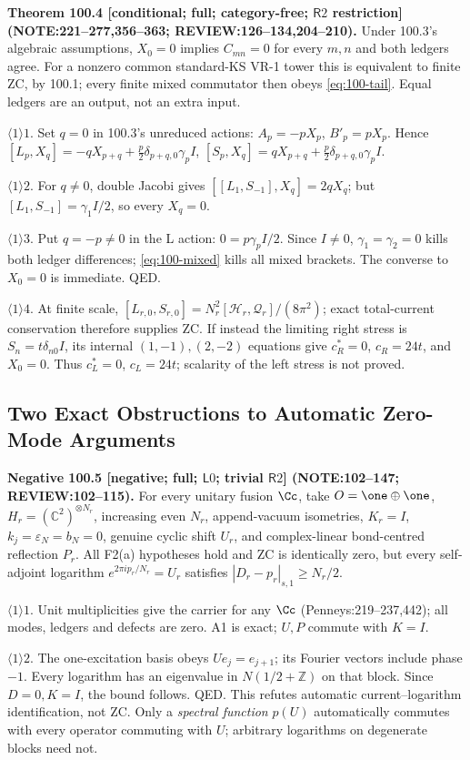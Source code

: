 \textbf{Theorem 100.4 [conditional; full; category-free; \(\mathsf R2\) restriction] (NOTE:221--277,356--363; REVIEW:126--134,204--210).}
Under 100.3's algebraic assumptions, \(X_0=0\) implies \(C_{mn}=0\) for every \(m,n\) and both ledgers agree.
For a nonzero common standard-KS VR-1 tower this is equivalent to finite ZC, by 100.1; every finite mixed
commutator then obeys \eqref{eq:100-tail}. Equal ledgers are an output, not an extra input.
\par\(\langle1\rangle1\). Set \(q=0\) in 100.3's unreduced actions: \(A_p=-pX_p\), \(B'_p=pX_p\). Hence
\([L_p,X_q]=-qX_{p+q}+\tfrac p2\delta_{p+q,0}\gamma_pI\),
\([S_p,X_q]=qX_{p+q}+\tfrac p2\delta_{p+q,0}\gamma_pI\).
\par\(\langle1\rangle2\). For \(q\ne0\), double Jacobi gives
\([[L_1,S_{-1}],X_q]=2qX_q\); but \([L_1,S_{-1}]=\gamma_1I/2\), so every \(X_q=0\).
\par\(\langle1\rangle3\). Put \(q=-p\ne0\) in the L action: \(0=p\gamma_pI/2\).
Since \(I\ne0\), \(\gamma_1=\gamma_2=0\) kills both ledger differences; \eqref{eq:100-mixed} kills all mixed brackets.
The converse to \(X_0=0\) is immediate. QED.
\par\(\langle1\rangle4\). At finite scale,
\([L_{r,0},S_{r,0}]=N_r^2[\mathcal H_r,\mathcal Q_r]/(8\pi^2)\); exact total-current conservation therefore supplies ZC.
If instead the limiting right stress is \(S_n=t\delta_{n0}I\), its internal \((1,-1),(2,-2)\) equations give
\(c_R^*=0\), \(c_R=24t\), and \(X_0=0\). Thus \(c_L^*=0\), \(c_L=24t\); scalarity of the left stress is not proved.

\subsection{Two Exact Obstructions to Automatic Zero-Mode Arguments}

\textbf{Negative 100.5 [negative; full; \(\mathsf L0\); trivial \(\mathsf R2\)] (NOTE:102--147; REVIEW:102--115).}
For every unitary fusion \(\Cc\), take \(O=\one\oplus\one\), \(H_r=(\mathbb C^2)^{\otimes N_r}\), increasing even
\(N_r\), append-vacuum isometries, \(K_r=I\), \(k_j=\varepsilon_N=b_N=0\), genuine cyclic shift \(U_r\),
and complex-linear bond-centred reflection \(P_r\). All F2(a) hypotheses hold and ZC is identically zero,
but every self-adjoint logarithm \(e^{2\pi ip_r/N_r}=U_r\) satisfies \(|D_r-p_r|_{s,1}\ge N_r/2\).
\par\(\langle1\rangle1\). Unit multiplicities give the carrier for any \(\Cc\) (Penneys:219--237,442);
all modes, ledgers and defects are zero. A1 is exact; \(U,P\) commute with \(K=I\).
\par\(\langle1\rangle2\). The one-excitation basis obeys \(Ue_j=e_{j+1}\); its Fourier vectors include phase \(-1\).
Every logarithm has an eigenvalue in \(N(1/2+\mathbb Z)\) on that block. Since \(D=0,K=I\), the bound follows. QED.
This refutes automatic current--logarithm identification, not ZC. Only a \emph{spectral function} \(p(U)\) automatically commutes with every operator commuting with \(U\); arbitrary logarithms on degenerate blocks need not.

